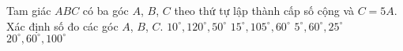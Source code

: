 \begin{ex}%
	Tam giác $ ABC $ có ba góc $ A $, $ B $, $ C $ theo thứ tự lập thành cấp số cộng và $ C=5A $. Xác định số đo các góc $ A $, $ B $, $ C $.
	\choice
	{$ 10^{\circ}, 120^{\circ}, 50^{\circ} $}
	{$ 15^{\circ}, 105^{\circ},  60^{\circ} $}
	{$ 5^{\circ}, 60^{\circ}, 25^{\circ} $}
	{\True $ 20^{\circ}, 60^{\circ}, 100^{\circ} $}
\end{ex}
